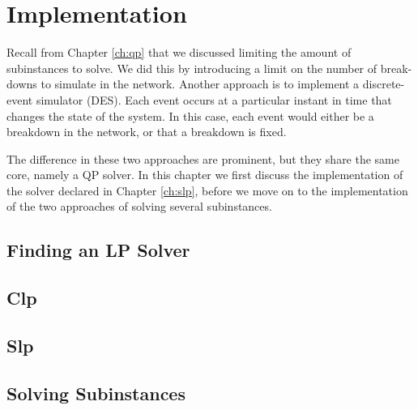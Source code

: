 \section{Implementation}
Recall from Chapter \ref{ch:qp} that we discussed limiting the amount
of subinstances to solve. We did this by introducing a limit on the number of
break-downs to simulate in the network.
Another approach is to implement a discrete-event simulator (DES). Each event
occurs at a particular instant in time that changes the state of the system.
In this case, each event would either be a breakdown in the network, or that
a breakdown is fixed.

The difference in these two approaches are prominent, but they share the same
core, namely a QP solver. In this chapter we first discuss the implementation
of the solver declared in Chapter \ref{ch:slp}, before we move on to the
implementation of the two approaches of solving several subinstances.
\label{ch:implementation}

\subsection{Finding an LP Solver}


\subsection{Clp}


\subsection{Slp}


\subsection{Solving Subinstances}

